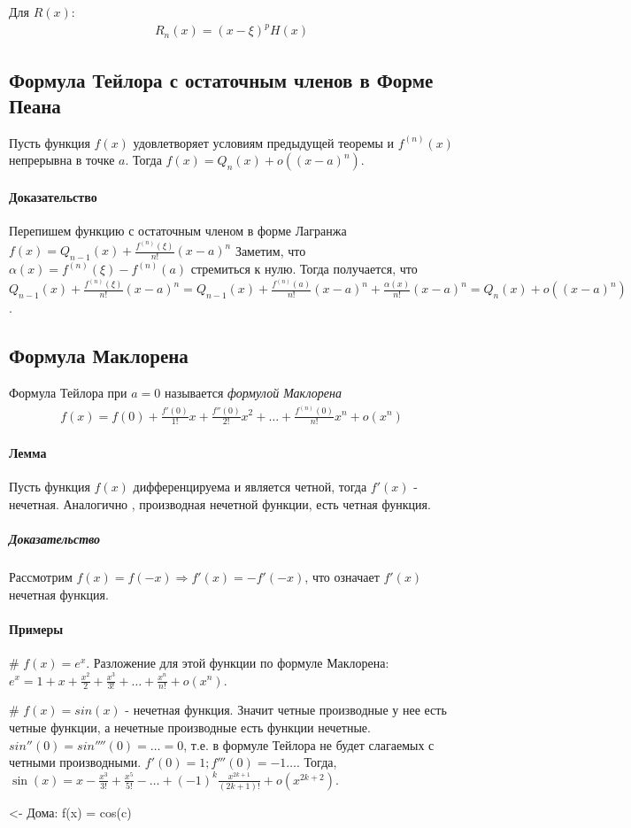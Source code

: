 \documentclass[10pt]{article}
\begin{document}
			Для $R(x)$:
			\begin{eqnarray}
				R_n(x) = (x - \xi)^pH(x)
			\end{eqnarray}
			
		\subsection{Формула Тейлора с остаточным членов в Форме Пеана}
		Пусть функция $f(x)$ удовлетворяет условиям предыдущей теоремы и $f^{(n)}(x)$ непрерывна в точке $a$. Тогда $f(x) = Q_n(x) + o((x-a)^n)$.
		
		\paragraph{Доказательство}
		Перепишем функцию с остаточным членом в форме Лагранжа $f(x) = Q_{n-1}(x) + \frac{f^{(n)}(\xi)}{n!}(x-a)^n$ Заметим, что $\alpha(x) = f^{(n)}(\xi) - f^{(n)}(a)$ стремиться к нулю. Тогда получается, что $Q_{n-1}(x) + \frac{f^{(n)}(\xi)}{n!}(x-a)^n = Q_{n-1}(x) + \frac{f^{(n)}(a)}{n!}(x-a)^n + \frac{\alpha(x)}{n!}(x-a)^n = Q_n(x) + o((x-a)^n)$.
		
		\subsection{Формула Маклорена}
		Формула Тейлора при $a = 0$ называется \textit{формулой Маклорена}
		\begin{eqnarray}
			f(x) = f(0) + \frac{f'(0)}{1!}x + \frac{f''(0)}{2!}x^2 + \dots + \frac{f^{(n)}(0)}{n!}x^n + o(x^n)
		\end{eqnarray}
		
		\paragraph{Лемма}
		Пусть функция $f(x)$ дифференцируема и является четной, тогда $f'(x)$ - нечетная. Аналогично , производная нечетной функции, есть четная функция.
		
		\subparagraph{Доказательство}
		Рассмотрим $f(x) = f(-x) \Rightarrow f'(x) = -f'(-x)$, что означает $f'(x)$ нечетная функция.
		
		\paragraph{Примеры}
		\# $f(x) = e^x$. Разложение для этой функции по формуле Маклорена: $e^x = 1 + x + \frac{x^2}{2} + \frac{x^3}{3!} + \dots + \frac{x^n}{n!} + o(x^n)$.
		
		\# $f(x) = sin(x)$ - нечетная функция. Значит четные производные у нее есть четные функции, а нечетные производные есть функции нечетные. $sin''(0) = sin''''(0) = \dots = 0$, т.е. в формуле Тейлора не будет слагаемых с четными производными. $f'(0) = 1; f'''(0) = -1 \dots$. Тогда, $\sin(x) = x - \frac{x^3}{3!} + \frac{x^5}{5!} - \dots + (-1)^{k}\frac{x^{2k+1}}{(2k + 1)!} + o(x^{2k+2})$.
		
		<- Дома: f(x) = cos(c)
\end{document}

